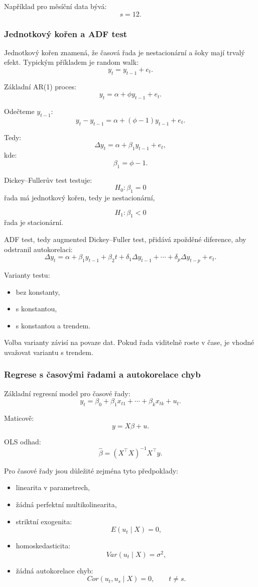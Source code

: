 Například pro měsíční data bývá:
\[
    s=12.
\]

\subsubsection{Jednotkový kořen a ADF test}

Jednotkový kořen znamená, že časová řada je nestacionární a šoky mají trvalý efekt. Typickým příkladem
je random walk:
\[
    y_t=y_{t-1}+e_t.
\]

Základní AR(1) proces:
\[
    y_t=\alpha+\phi y_{t-1}+e_t.
\]

Odečteme $y_{t-1}$:
\[
    y_t-y_{t-1}=\alpha+(\phi-1)y_{t-1}+e_t.
\]

Tedy:
\[
    \Delta y_t=\alpha+\beta_1y_{t-1}+e_t,
\]
kde:
\[
    \beta_1=\phi-1.
\]

Dickey--Fullerův test testuje:
\[
    H_0:\beta_1=0
\]
řada má jednotkový kořen, tedy je nestacionární,

\[
    H_1:\beta_1<0
\]
řada je stacionární.

ADF test, tedy augmented Dickey--Fuller test, přidává zpožděné diference, aby odstranil autokorelaci:
\[
    \Delta y_t =
    \alpha+\beta_1 y_{t-1}+\beta_2t
    +\delta_1\Delta y_{t-1}
    +\cdots+
    \delta_p\Delta y_{t-p}
    +e_t.
\]

Varianty testu:
\begin{itemize}
    \item bez konstanty,
    \item s konstantou,
    \item s konstantou a trendem.
\end{itemize}

Volba varianty závisí na povaze dat. Pokud řada viditelně roste v čase, je vhodné uvažovat variantu
s trendem.

\subsubsection{Regrese s časovými řadami a autokorelace chyb}

Základní regresní model pro časové řady:
\[
    y_t=\beta_0+\beta_1x_{t1}+\cdots+\beta_kx_{tk}+u_t.
\]

Maticově:
\[
    y=X\beta+u.
\]

OLS odhad:
\[
    \hat\beta=(X^\top X)^{-1}X^\top y.
\]

Pro časové řady jsou důležité zejména tyto předpoklady:
\begin{itemize}
    \item linearita v parametrech,
    \item žádná perfektní multikolinearita,
    \item striktní exogenita:
    \[
        E(u_t\mid X)=0,
    \]
    \item homoskedasticita:
    \[
        Var(u_t\mid X)=\sigma^2,
    \]
    \item žádná autokorelace chyb:
    \[
        Cor(u_t,u_s\mid X)=0,\qquad t\neq s.
    \]
\end{itemize}

